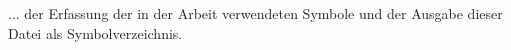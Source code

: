 
... der Erfassung der in der Arbeit verwendeten Symbole und der Ausgabe dieser Datei als Symbolverzeichnis. 
